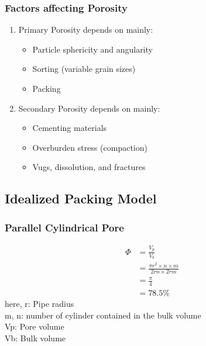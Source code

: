 \documentclass{article}
\begin{document}
\subsubsection*{Factors affecting Porosity}
\begin{enumerate}
    \item Primary Porosity depends on mainly:
    \begin{itemize}
        \item Particle sphericity and angularity
        \item Sorting (variable grain sizes)
        \item Packing
    \end{itemize}

    \item Secondary Porosity depends on mainly:
    \begin{itemize}
        \item Cementing materials
        \item Overburden stress (compaction)
        \item Vugs, dissolution, and fractures
    \end{itemize}
    
\end{enumerate}

\subsection*{Idealized Packing Model}

\subsubsection*{Parallel Cylindrical Pore} 
\begin{multicols}{2}
    \begin{align*}
        \Phi &= \frac{V_p}{V_b} \\ 
        &= \frac{\pi r^2 \times n \times m }{2rn \times 2rm} \\
        &= \frac{\pi}{4} \\
        &= 78.5\%  
    \end{align*}
    here, r: Pipe radius \\
    m, n: number of cylinder contained in the bulk volume\\
    Vp: Pore volume \\
    Vb: Bulk volume
\end{multicols}
\end{document}
